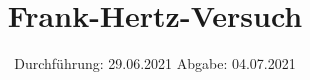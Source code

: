 

\subject{V601}
\title{Frank-Hertz-Versuch}
\date{%
  Durchführung: 29.06.2021
  \hspace{3em}
  Abgabe: 04.07.2021
}



\maketitle
\thispagestyle{empty}
\tableofcontents
\newpage






\printbibliography{}


